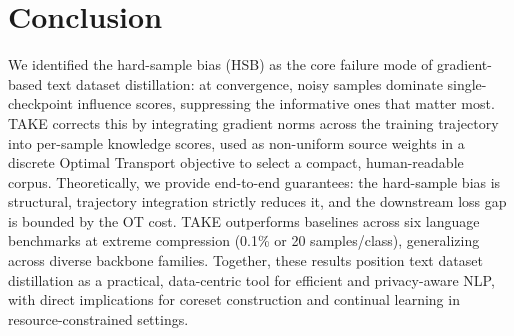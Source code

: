\section{Conclusion} \label{sec:07-conclusion}
\begin{foldable}
  We identified the hard-sample bias (HSB) as the core failure mode of gradient-based text dataset distillation: at convergence, noisy samples dominate single-checkpoint influence scores, suppressing the informative ones that matter most.
  TAKE corrects this by integrating gradient norms across the training trajectory into per-sample knowledge scores, used as non-uniform source weights in a discrete Optimal Transport objective to select a compact, human-readable corpus.
  Theoretically, we provide end-to-end guarantees: the hard-sample bias is structural, trajectory integration strictly reduces it, and the downstream loss gap is bounded by the OT cost.
  TAKE outperforms baselines across six language benchmarks at extreme compression (0.1\% or 20 samples/class), generalizing across diverse backbone families.
  Together, these results position text dataset distillation as a practical, data-centric tool for efficient and privacy-aware NLP, with direct implications for coreset construction and continual learning in resource-constrained settings.
\end{foldable}
